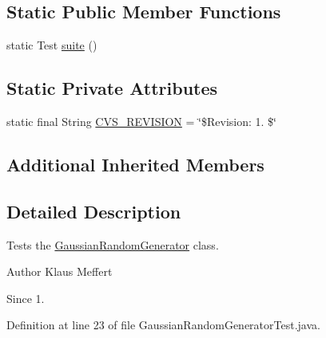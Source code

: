 \subsection*{Static Public Member Functions}
\begin{DoxyCompactItemize}
\item 
static Test \hyperlink{classorg_1_1jgap_1_1impl_1_1_gaussian_random_generator_test_abdf0ca737fd7c8bb4556cb2d773eec46}{suite} ()
\end{DoxyCompactItemize}
\subsection*{Static Private Attributes}
\begin{DoxyCompactItemize}
\item 
static final String \hyperlink{classorg_1_1jgap_1_1impl_1_1_gaussian_random_generator_test_a2b330a47902c49e5fb69a44ad516bbf1}{C\-V\-S\-\_\-\-R\-E\-V\-I\-S\-I\-O\-N} = \char`\"{}\$Revision\-: 1. \$\char`\"{}
\end{DoxyCompactItemize}
\subsection*{Additional Inherited Members}


\subsection{Detailed Description}
Tests the \hyperlink{classorg_1_1jgap_1_1impl_1_1_gaussian_random_generator}{Gaussian\-Random\-Generator} class.

\begin{DoxyAuthor}{Author}
Klaus Meffert 
\end{DoxyAuthor}
\begin{DoxySince}{Since}
1. 
\end{DoxySince}


Definition at line 23 of file Gaussian\-Random\-Generator\-Test.\-java.



